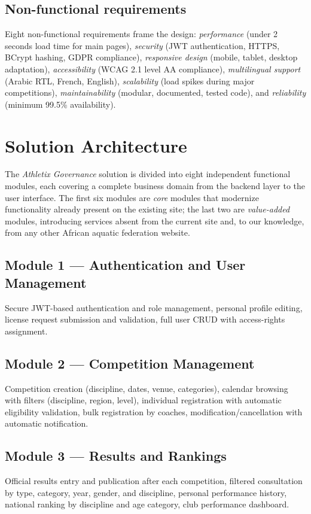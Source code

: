 \documentclass[conference]{IEEEtran}
\begin{document}
\subsection{Non-functional requirements}
Eight non-functional requirements frame the design: \emph{performance} (under 2 seconds load time for main pages), \emph{security} (JWT authentication, HTTPS, BCrypt hashing, GDPR compliance), \emph{responsive design} (mobile, tablet, desktop adaptation), \emph{accessibility} (WCAG 2.1 level AA compliance), \emph{multilingual support} (Arabic RTL, French, English), \emph{scalability} (load spikes during major competitions), \emph{maintainability} (modular, documented, tested code), and \emph{reliability} (minimum 99.5\% availability).

\section{Solution Architecture}
The \emph{Athletix Governance} solution is divided into eight independent functional modules, each covering a complete business domain from the backend layer to the user interface. The first six modules are \emph{core} modules that modernize functionality already present on the existing site; the last two are \emph{value-added} modules, introducing services absent from the current site and, to our knowledge, from any other African aquatic federation website.

\subsection{Module 1 — Authentication and User Management}
Secure JWT-based authentication and role management, personal profile editing, license request submission and validation, full user CRUD with access-rights assignment.

\subsection{Module 2 — Competition Management}
Competition creation (discipline, dates, venue, categories), calendar browsing with filters (discipline, region, level), individual registration with automatic eligibility validation, bulk registration by coaches, modification/cancellation with automatic notification.

\subsection{Module 3 — Results and Rankings}
Official results entry and publication after each competition, filtered consultation by type, category, year, gender, and discipline, personal performance history, national ranking by discipline and age category, club performance dashboard.
\end{document}
